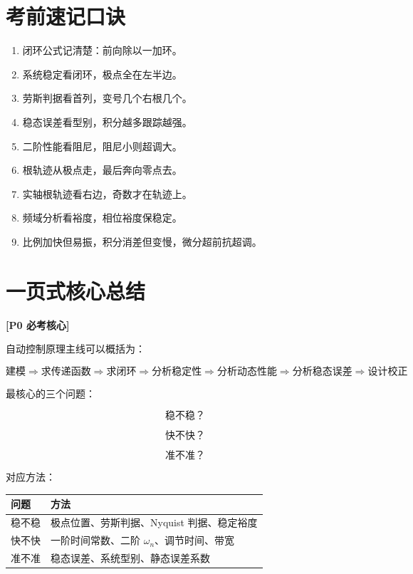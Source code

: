 \documentclass[UTF8,a4paper,12pt]{ctexart}
\newcommand{\Pzero}{\textcolor{p0}{\textbf{[P0 必考核心]}}}
\begin{document}
\section{考前速记口诀}

\begin{enumerate}
    \item 闭环公式记清楚：前向除以一加环。
    \item 系统稳定看闭环，极点全在左半边。
    \item 劳斯判据看首列，变号几个右根几个。
    \item 稳态误差看型别，积分越多跟踪越强。
    \item 二阶性能看阻尼，阻尼小则超调大。
    \item 根轨迹从极点走，最后奔向零点去。
    \item 实轴根轨迹看右边，奇数才在轨迹上。
    \item 频域分析看裕度，相位裕度保稳定。
    \item 比例加快但易振，积分消差但变慢，微分超前抗超调。
\end{enumerate}

\section{一页式核心总结}

\Pzero

自动控制原理主线可以概括为：

\[
\text{建模}
\Rightarrow
\text{求传递函数}
\Rightarrow
\text{求闭环}
\Rightarrow
\text{分析稳定性}
\Rightarrow
\text{分析动态性能}
\Rightarrow
\text{分析稳态误差}
\Rightarrow
\text{设计校正}
\]

最核心的三个问题：

\[
\text{稳不稳？}
\]

\[
\text{快不快？}
\]

\[
\text{准不准？}
\]

对应方法：

\begin{longtable}{p{4cm}p{10cm}}
\toprule
问题 & 方法 \\
\midrule
稳不稳 & 极点位置、劳斯判据、Nyquist 判据、稳定裕度 \\
快不快 & 一阶时间常数、二阶 $\omega_n$、调节时间、带宽 \\
准不准 & 稳态误差、系统型别、静态误差系数 \\
\bottomrule
\end{longtable}
\end{document}
